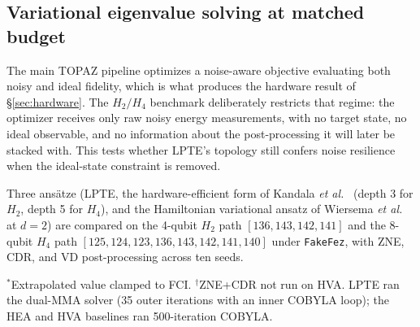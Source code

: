 \documentclass[twocolumn,aps,prl,superscriptaddress,showkeys]{revtex4-2}
\theoremstyle{plain}
\theoremstyle{definition}
\newcommand{\fakefez}{\texttt{FakeFez}}
\begin{document}
\subsection{Variational eigenvalue solving at matched budget}
\label{sec:vqe-matched}

The main TOPAZ pipeline optimizes a noise-aware objective evaluating both noisy and ideal fidelity, which is what produces the hardware result of \S\ref{sec:hardware}. The $H_2/H_4$ benchmark deliberately restricts that regime: the optimizer receives only raw noisy energy measurements, with no target state, no ideal observable, and no information about the post-processing it will later be stacked with. This tests whether LPTE's topology still confers noise resilience when the ideal-state constraint is removed.

Three ans\"atze (LPTE, the hardware-efficient form of Kandala \emph{et al.}~\cite{Kandala2017} (depth 3 for $H_2$, depth 5 for $H_4$), and the Hamiltonian variational ansatz of Wiersema \emph{et al.}~\cite{Wiersema2020} at $d=2$) are compared on the 4-qubit $H_2$ path $[136,143,142,141]$ and the 8-qubit $H_4$ path $[125,124,123,136,143,142,141,140]$ under \fakefez, with ZNE, CDR, and VD post-processing across ten seeds.

\begin{table}[htbp]
\centering
\caption{$H_2/H_4$ variational benchmark under \fakefez, energy error relative to FCI in mHa, mean$\pm$s.d. over 10 seeds. The recorded runs used unequal optimizer budgets (see text); Table~\ref{tab:vqe-matched} reports the equalized re-evaluation, which reverses the $H_4$ ranking.}
\label{tab:vqe}
\vspace{2pt}
{\raggedright\scriptsize $^{\ast}$Extrapolated value clamped to FCI. $^{\dagger}$ZNE+CDR not run on HVA. LPTE ran the dual-MMA solver (35 outer iterations with an inner COBYLA loop); the HEA and HVA baselines ran 500-iteration COBYLA.}
\end{table}
\end{document}
